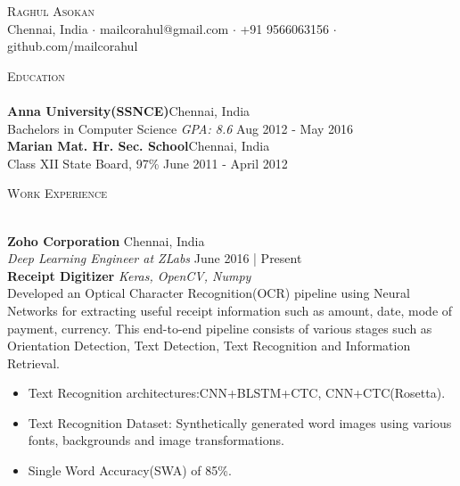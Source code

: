 \documentclass[a4paper]{article}
\newcommand{\lineunder} {
    \vspace*{-8pt} \\
    \hspace*{-18pt} \hrulefill \\
}
\newcommand{\header} [1] {
    {\hspace*{-18pt}\vspace*{6pt} \textsc{#1}}
    \vspace*{-6pt} \lineunder
}
\begin{document}
\vspace*{-40pt}

    

\vspace*{-10pt}
\begin{center}
	{\Huge \scshape {Raghul Asokan}}\\
	Chennai, India $\cdot$ mailcorahul@gmail.com $\cdot$ +91 9566063156 $\cdot$ github.com/mailcorahul\\
\end{center}

\header{Education}
\textbf{Anna University(SSNCE)}\hfill Chennai, India\\
Bachelor\textquotesingle{}s in Computer Science \textit{GPA: 8.6} \hfill Aug 2012 - May 2016\\
\vspace{2mm}
\textbf{Marian Mat. Hr. Sec. School}\hfill Chennai, India\\
Class XII State Board, 97\% \hfill June 2011 - April 2012\\
\vspace{2mm}

\header{Work Experience}
\vspace{1mm}

\textbf{Zoho Corporation} \hfill Chennai, India\\
\textit{Deep Learning Engineer at ZLabs} \hfill June 2016 | Present\\
\vspace*{2mm}
{\textbf{Receipt Digitizer}} {\sl Keras, OpenCV, Numpy} \\
Developed an Optical Character Recognition(OCR) pipeline using Neural Networks for extracting useful receipt information such as amount, date, mode of payment, currency. This end-to-end pipeline consists of various stages such as Orientation Detection, Text Detection, Text Recognition and Information Retrieval.\\            
            \begin{itemize}
                \itemsep-0.5em
                \item Text Recognition architectures:CNN+BLSTM+CTC, CNN+CTC(Rosetta).
                \item Text Recognition Dataset: Synthetically generated word images using various fonts, backgrounds and image transformations.
                \item Single Word Accuracy(SWA) of 85\%.
            \end{itemize}
\end{document}
